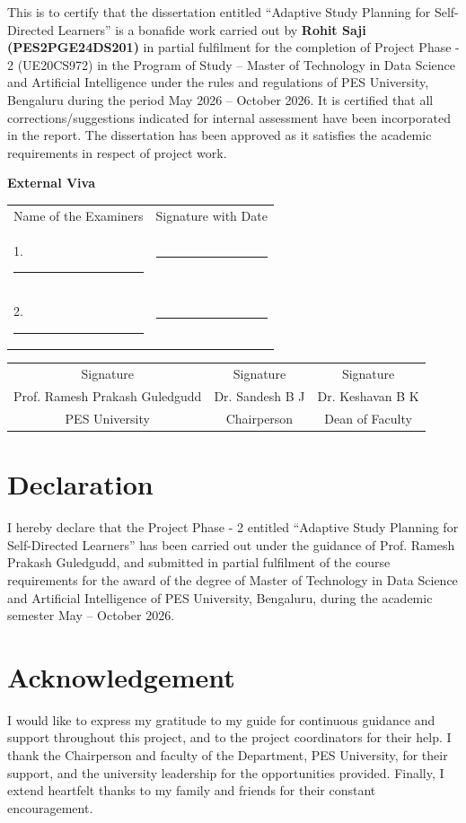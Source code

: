 \documentclass[12pt]{report}
\begin{document}
\vfill
This is to certify that the dissertation entitled ``Adaptive Study Planning for Self-Directed Learners'' is a bonafide work carried out by \textbf{Rohit Saji (PES2PGE24DS201)} in partial fulfilment for the completion of Project Phase - 2 (UE20CS972) in the Program of Study -- Master of Technology in Data Science and Artificial Intelligence under the rules and regulations of PES University, Bengaluru during the period May 2026 -- October 2026. It is certified that all corrections/suggestions indicated for internal assessment have been incorporated in the report. The dissertation has been approved as it satisfies the academic requirements in respect of project work.

\vfill
\textbf{External Viva}

\vspace{0.2cm}
\noindent
\begin{tabular}{ll}
Name of the Examiners & Signature with Date \\
1. \rule{5cm}{0.4pt} & \rule{5cm}{0.4pt} \\[0.4cm]
2. \rule{5cm}{0.4pt} & \rule{5cm}{0.4pt} \\
\end{tabular}

\vfill
\noindent
\begin{tabular*}{\textwidth}{@{\extracolsep{\fill}}ccc}
Signature & Signature & Signature \\
Prof. Ramesh Prakash Guledgudd & Dr. Sandesh B J & Dr. Keshavan B K \\
PES University & Chairperson & Dean of Faculty \\
\end{tabular*}
\vfill
\null

\newpage

\section*{Declaration}
I hereby declare that the Project Phase - 2 entitled ``Adaptive Study Planning for Self-Directed Learners'' has been carried out under the guidance of Prof. Ramesh Prakash Guledgudd, and submitted in partial fulfilment of the course requirements for the award of the degree of Master of Technology in Data Science and Artificial Intelligence of PES University, Bengaluru, during the academic semester May -- October 2026.

\newpage

\section*{Acknowledgement}
I would like to express my gratitude to my guide for continuous guidance and support throughout this project, and to the project coordinators for their help. I thank the Chairperson and faculty of the Department, PES University, for their support, and the university leadership for the opportunities provided. Finally, I extend heartfelt thanks to my family and friends for their constant encouragement.
\end{document}
